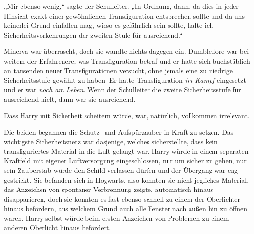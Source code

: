 „Mir ebenso wenig,“ sagte der Schulleiter. „In Ordnung, dann, da dies in jeder Hinsicht exakt einer gewöhnlichen Transfiguration entsprechen sollte und da uns keinerlei Grund einfallen mag, wieso es gefährlich sein sollte, halte ich Sicherheitsvorkehrungen der zweiten Stufe für ausreichend.“

Minerva war überrascht, doch sie wandte nichts dagegen ein. Dumbledore war bei weitem der Erfahrenere, was Transfiguration betraf und er hatte sich buchstäblich an tausenden neuer Transfigurationen versucht, ohne jemals eine zu niedrige Sicherheitsstufe gewählt zu haben. Er hatte Transfiguration \emph{im Kampf} eingesetzt und er war \emph{noch am Leben.} Wenn der Schulleiter die zweite Sicherheitsstufe für ausreichend hielt, dann war sie ausreichend.

Dass Harry mit Sicherheit scheitern würde, war, natürlich, vollkommen irrelevant.

Die beiden begannen die Schutz- und Aufspürzauber in Kraft zu setzen. Das wichtigste Sicherheitsnetz war dasjenige, welches sicherstellte, dass kein transfiguriertes Material in die Luft gelangt war. Harry würde in einem separaten Kraftfeld mit eigener Luftversorgung eingeschlossen, nur um sicher zu gehen, nur sein Zauberstab würde den Schild verlassen dürfen und der Übergang war eng gestrickt. Sie befanden sich in Hogwarts, also konnten sie nicht jegliches Material, das Anzeichen von spontaner Verbrennung zeigte, automatisch hinaus disapparieren, doch sie konnten es fast ebenso schnell zu einem der Oberlichter hinaus befördern, aus welchem Grund auch alle Fenster nach außen hin zu öffnen waren. Harry selbst würde beim ersten Anzeichen von Problemen zu einem anderen Oberlicht hinaus befördert.

